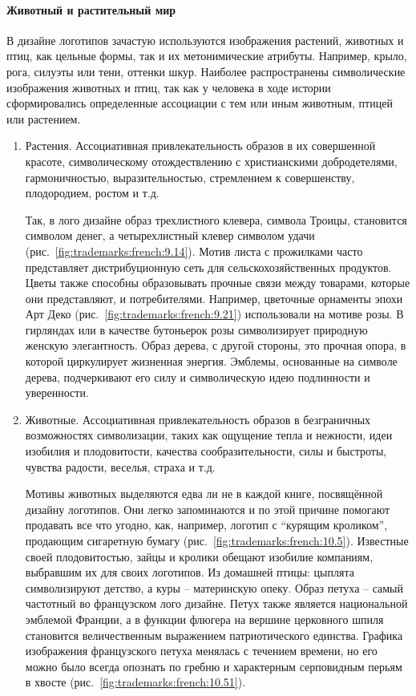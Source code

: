 \paragraph{Животный и растительный мир}

В дизайне логотипов зачастую используются изображения растений, животных и птиц,
как цельные формы, так и их метонимические атрибуты. Например, крыло, рога,
силуэты или тени, оттенки шкур. Наиболее распространены символические изображения
животных и птиц, так как у человека в ходе истории сформировались определенные
ассоциации с тем или иным животным, птицей или растением.

\begin{enumerate}
\item Растения. Ассоциативная привлекательность образов в их совершенной
  красоте, символическому отождествлению с христианскими добродетелями,
  гармоничностью, выразительностью, стремлением к совершенству, плодородием,
  ростом и т.д.

  Так, в лого дизайне образ трехлистного клевера, символа Троицы, становится
  символом денег, а четырехлистный клевер символом удачи
  (рис.~\ref{fig:trademarks:french:9.14}). Мотив листа с прожилками часто
  представляет дистрибуционную сеть для сельскохозяйственных продуктов. Цветы
  также способны образовывать прочные связи между товарами, которые они
  представляют, и потребителями. Например, цветочные орнаменты эпохи Арт Деко
  (рис.~\ref{fig:trademarks:french:9.21}) использовали на мотиве розы.  В
  гирляндах или в качестве бутоньерок розы символизирует природную женскую
  элегантность. Образ дерева, с другой стороны, это прочная опора, в которой
  циркулирует жизненная энергия. Эмблемы, основанные на символе дерева,
  подчеркивают его силу и символическую идею подлинности и уверенности.

\item Животные. Ассоциативная привлекательность образов в безграничных
  возможностях символизации, таких как ощущение тепла и нежности, идеи изобилия и
  плодовитости, качества сообразительности, силы и быстроты, чувства радости,
  веселья, страха и т.д.

  Мотивы животных выделяются едва ли не в каждой книге, посвящённой дизайну
  логотипов. Они легко запоминаются и по этой причине помогают продавать все что
  угодно, как, например, логотип с “курящим кроликом”, продающим сигаретную бумагу
  (рис.~\ref{fig:trademarks:french:10.5}). Известные своей плодовитостью, зайцы и
  кролики обещают изобилие компаниям, выбравшим их для своих логотипов.  Из
  домашней птицы: цыплята символизируют детство, а куры -- материнскую опеку.
  Образ петуха -- самый частотный во французском лого дизайне. Петух также
  является национальной эмблемой Франции, а в функции флюгера на вершине
  церковного шпиля становится величественным выражением патриотического
  единства. Графика изображения французского петуха менялась с течением времени,
  но его можно было всегда опознать по гребню и характерным серповидным перьям в
  хвосте (рис.~\ref{fig:trademarks:french:10.51}).


\end{enumerate}

